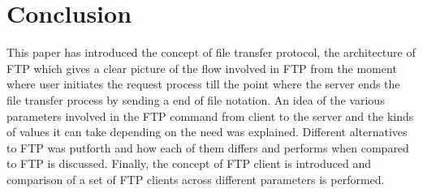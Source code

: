 \documentclass[9pt,twocolumn,twoside]{styles/osajnl}
\begin{document}
\section{Conclusion}

This paper has introduced the concept of file transfer protocol, the architecture of FTP which gives a clear picture of the flow involved in FTP from the moment where user initiates the request process till the point where the server ends the file transfer process by sending a end of file notation. An idea of the various parameters involved in the FTP command from client to the server and the kinds of values it can take depending on the need was explained. Different alternatives to FTP was putforth and how each of them differs and performs when compared to FTP is discussed. Finally, the concept of FTP client is introduced and comparison of a set of FTP clients across different parameters is performed.


\end{document}
